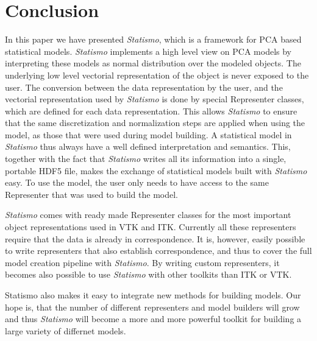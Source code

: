 \documentclass{InsightArticle}
\newcommand{\Statismo}{\emph{Statismo}\xspace}
\begin{document}
\section{Conclusion}
In this paper we have presented \Statismo, which is a framework for
PCA based statistical models.  \Statismo implements a high level view
on PCA models by interpreting these models as normal distribution over
the modeled objects. The underlying low level vectorial representation
of the object is never exposed to the user.  The conversion between
the data representation by the user, and the vectorial representation
used by \Statismo is done by special Representer classes, which are
defined for each data representation. This allows \Statismo to ensure
that the same discretization and normalization steps are applied when
using the model, as those that were used during model building.  A
statistical model in \Statismo thus always have a well defined
interpretation and semantics.  This, together with the fact that
\Statismo writes all its information into a single, portable HDF5
file, makes the exchange of statistical models built with \Statismo
easy. To use the model, the user only needs to have access to the same Representer that was used to build the model. 

\Statismo comes with ready made Representer classes for the most important object representations used in VTK and ITK. 
Currently all these representers require that the data is already in correspondence. It is, however, easily possible to 
write representers that also establish correspondence, and thus to cover the full model creation pipeline with \Statismo.
By writing custom representers, it becomes also possible to use \Statismo with other toolkits than ITK or VTK. 

Statismo also makes it easy to integrate new methods for building models. Our hope is, that the number of different representers
and model builders will grow and thus \Statismo will become a more and more powerful toolkit for building a large variety of differnet 
models.





\end{document}
